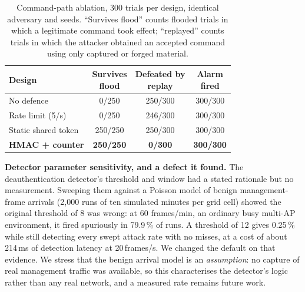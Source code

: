 \begin{table}[t]
\centering\small
\caption{Command-path ablation, 300 trials per design, identical adversary and seeds.
``Survives flood'' counts flooded trials in which a legitimate command took effect;
``replayed'' counts trials in which the attacker obtained an accepted command using only
captured or forged material.}
\label{tab:ablation}
\begin{tabular}{@{}lccc@{}}
\toprule
Design & \shortstack{Survives\\flood} & \shortstack{Defeated by\\replay} & \shortstack{Alarm\\fired} \\
\midrule
No defence              & 0/250   & 250/300 & 300/300 \\
Rate limit (5/s)        & 0/250   & 246/300 & 300/300 \\
Static shared token     & 250/250 & 250/300 & 300/300 \\
\textbf{HMAC + counter} & \textbf{250/250} & \textbf{0/300} & \textbf{300/300} \\
\bottomrule
\end{tabular}
\end{table}

\textbf{Detector parameter sensitivity, and a defect it found.} The deauthentication detector's
threshold and window had a stated rationale but no measurement. Sweeping them against a Poisson
model of benign management-frame arrivals (2{,}000 runs of ten simulated minutes per grid cell)
showed the original threshold of 8 was wrong: at 60 frames/min, an ordinary busy multi-AP
environment, it fired spuriously in 79.9\,\% of runs. A threshold of 12 gives 0.25\,\% while
still detecting every swept attack rate with no misses, at a cost of about 214\,ms of detection
latency at 20\,frames/s. We changed the default on that evidence. We stress that the benign
arrival model is an \emph{assumption}: no capture of real management traffic was available, so
this characterises the detector's logic rather than any real network, and a measured rate
remains future work.

